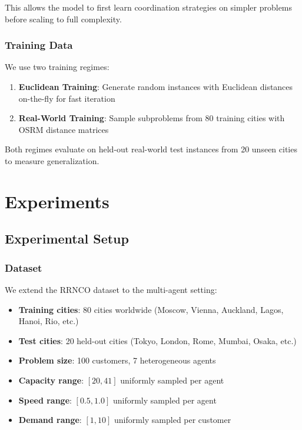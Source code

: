 \documentclass[lettersize,journal]{IEEEtran}
\begin{document}
This allows the model to first learn coordination strategies on simpler problems before scaling to full complexity.

\subsubsection{Training Data}

We use two training regimes:
\begin{enumerate}
\item \textbf{Euclidean Training}: Generate random instances with Euclidean distances on-the-fly for fast iteration
\item \textbf{Real-World Training}: Sample subproblems from 80 training cities with OSRM distance matrices
\end{enumerate}

Both regimes evaluate on held-out real-world test instances from 20 unseen cities to measure generalization.

\section{Experiments}

\subsection{Experimental Setup}

\subsubsection{Dataset}

We extend the RRNCO dataset to the multi-agent setting:
\begin{itemize}
\item \textbf{Training cities}: 80 cities worldwide (Moscow, Vienna, Auckland, Lagos, Hanoi, Rio, etc.)
\item \textbf{Test cities}: 20 held-out cities (Tokyo, London, Rome, Mumbai, Osaka, etc.)
\item \textbf{Problem size}: 100 customers, 7 heterogeneous agents
\item \textbf{Capacity range}: $[20, 41]$ uniformly sampled per agent
\item \textbf{Speed range}: $[0.5, 1.0]$ uniformly sampled per agent
\item \textbf{Demand range}: $[1, 10]$ uniformly sampled per customer
\end{itemize}
\end{document}
